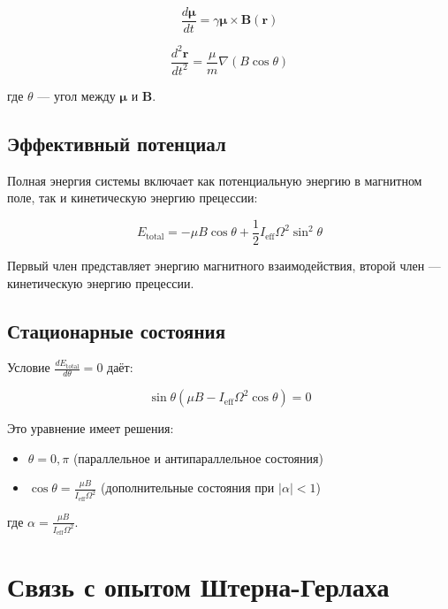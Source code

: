 \documentclass[12pt]{article}
\begin{document}
\begin{equation}
\frac{d\boldsymbol{\mu}}{dt} = \gamma \boldsymbol{\mu} \times \boldsymbol{B}(\boldsymbol{r})
\end{equation}

\begin{equation}
\frac{d^2\boldsymbol{r}}{dt^2} = \frac{\mu}{m} \nabla(B \cos\theta)
\end{equation}

где $\theta$ — угол между $\boldsymbol{\mu}$ и $\boldsymbol{B}$.

\subsection{Эффективный потенциал}

Полная энергия системы включает как потенциальную энергию в магнитном поле, так и кинетическую энергию прецессии:

\begin{equation}
E_{\text{total}} = -\mu B \cos\theta + \frac{1}{2} I_{\text{eff}} \Omega^2 \sin^2\theta
\end{equation}

Первый член представляет энергию магнитного взаимодействия, второй член — кинетическую энергию прецессии.

\subsection{Стационарные состояния}

Условие $\frac{dE_{\text{total}}}{d\theta} = 0$ даёт:

\begin{equation}
\sin\theta \left( \mu B - I_{\text{eff}} \Omega^2 \cos\theta \right) = 0
\end{equation}

Это уравнение имеет решения:
\begin{itemize}
\item $\theta = 0, \pi$ (параллельное и антипараллельное состояния)
\item $\cos\theta = \frac{\mu B}{I_{\text{eff}} \Omega^2}$ (дополнительные состояния при $|\alpha| < 1$)
\end{itemize}

где $\alpha = \frac{\mu B}{I_{\text{eff}} \Omega^2}$.

\section{Связь с опытом Штерна-Герлаха}
\end{document}
